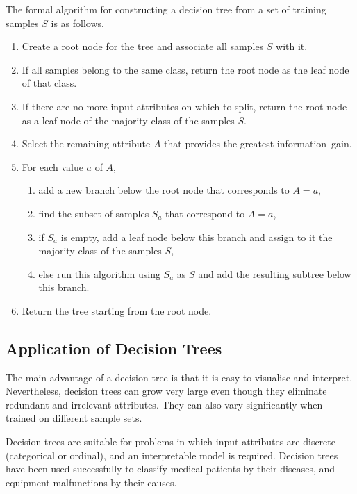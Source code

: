 The formal algorithm for constructing a decision tree from a set of training samples \( S \) is as follows.
\begin{enumerate}
  \item Create a root node for the tree and associate all samples \( S \) with it.
  \item If all samples belong to the same class, return the root node as the leaf node of that class.
  \item If there are no more input attributes on which to split, return the root node as a leaf node of the majority class of the samples \( S \)\@.
  \item Select the remaining attribute \( A \) that provides the greatest information~gain.
  \item For each value \( a \) of \( A \),
  \begin{enumerate}
    \item add a new branch below the root node that corresponds to \( A = a \),
    \item find the subset of samples \( S_{a} \) that correspond to \( A = a \),
    \item if \( S_{a} \) is empty, add a leaf node below this branch and assign to it the majority class of the samples \( S \),
    \item else run this algorithm using \( S_{a} \) as \( S \) and add the resulting subtree below this branch.
  \end{enumerate}
  \item Return the tree starting from the root node.
\end{enumerate}

\subsection{Application of Decision Trees}

The main advantage of a decision tree is that it is easy to visualise and interpret.
Nevertheless, decision trees can grow very large even though they eliminate redundant and irrelevant attributes.
They can also vary significantly when trained on different sample sets.

Decision trees are suitable for problems in which input attributes are discrete (categorical or ordinal), and an interpretable model is required.
Decision trees have been used successfully to classify medical patients by their diseases, and equipment malfunctions by their causes.
